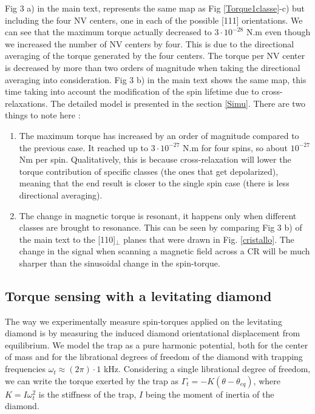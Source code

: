 \documentclass[preprintnumbers,amsmath,amssymb,onecolumn,12pt]{revtex4}
\begin{document}
Fig 3 a) in the main text, represents the same map as Fig \ref{Torque1classe}-c) but including the four NV centers, one in each of the possible [111] orientations. We can see that the maximum torque actually decreased to $3\cdot 10^{-28}$ N.m even though we increased the number of NV centers by four. This is due to the directional averaging of the torque generated by the four centers. The torque per NV center is decreased by more than two orders of magnitude when taking the directional averaging into consideration.
Fig 3 b) in the main text shows the same map, this time taking into account the modification of the spin lifetime due to cross-relaxations. The detailed model is presented in the section \ref{Simu}.
There are two things to note here : 
\begin{enumerate}
\item The maximum torque has increased by an order of magnitude compared to the previous case. It reached up to $3\cdot 10^{-27}$ N.m for four spins, so about $10^{-27}$ Nm per spin. Qualitatively, this is because cross-relaxation will lower the torque contribution of specific classes (the ones that get depolarized), meaning that the end result is closer to the single spin case (there is less directional averaging).
\item The change in magnetic torque is resonant, it happens only when different classes are brought to resonance. This can be seen by comparing Fig 3 b) of the main text to the [110]$_\perp$ planes that were drawn in Fig. \ref{cristallo}. The change in the signal when scanning a magnetic field across a CR will be much sharper than the sinusoidal change in the spin-torque.
\end{enumerate} 

\subsection{Torque sensing with a levitating diamond}

The way we experimentally measure spin-torques applied on the levitating diamond is by measuring the induced diamond orientational displacement from equilibrium. 
We model the trap as a pure harmonic potential, both for the center of mass and for the librational degrees of freedom of the diamond with trapping frequencies $\omega_t \approx (2\pi) \cdot 1$ kHz. Considering a single librational degree of freedom, we can write the torque exerted by the trap as $\Gamma_t=-K(\theta-\theta_{eq})$, where $K=I \omega_t^2$ is the stiffness of the trap, $I$ being the moment of inertia of the diamond.
\end{document}
